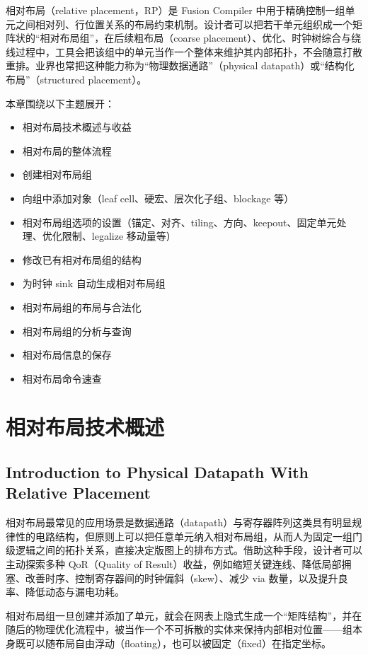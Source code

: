 \label{chap:rp}

相对布局（relative placement，RP）是 Fusion Compiler 中用于精确控制一组单元之间相对列、行位置关系的布局约束机制。设计者可以把若干单元组织成一个矩阵状的“相对布局组”，在后续粗布局（coarse placement）、优化、时钟树综合与绕线过程中，工具会把该组中的单元当作一个整体来维护其内部拓扑，不会随意打散重排。业界也常把这种能力称为“物理数据通路”（physical datapath）或“结构化布局”（structured placement）。

本章围绕以下主题展开：
\begin{itemize}
  \item 相对布局技术概述与收益
  \item 相对布局的整体流程
  \item 创建相对布局组
  \item 向组中添加对象（leaf cell、硬宏、层次化子组、blockage 等）
  \item 相对布局组选项的设置（锚定、对齐、tiling、方向、keepout、固定单元处理、优化限制、legalize 移动量等）
  \item 修改已有相对布局组的结构
  \item 为时钟 sink 自动生成相对布局组
  \item 相对布局组的布局与合法化
  \item 相对布局组的分析与查询
  \item 相对布局信息的保存
  \item 相对布局命令速查
\end{itemize}

\section{相对布局技术概述}
\subsection*{Introduction to Physical Datapath With Relative Placement}

相对布局最常见的应用场景是数据通路（datapath）与寄存器阵列这类具有明显规律性的电路结构，但原则上可以把任意单元纳入相对布局组，从而人为固定一组门级逻辑之间的拓扑关系，直接决定版图上的排布方式。借助这种手段，设计者可以主动探索多种 QoR（Quality of Result）收益，例如缩短关键连线、降低局部拥塞、改善时序、控制寄存器间的时钟偏斜（skew）、减少 via 数量，以及提升良率、降低动态与漏电功耗。

相对布局组一旦创建并添加了单元，就会在网表上隐式生成一个“矩阵结构”，并在随后的物理优化流程中，被当作一个不可拆散的实体来保持内部相对位置——组本身既可以随布局自由浮动（floating），也可以被固定（fixed）在指定坐标。

